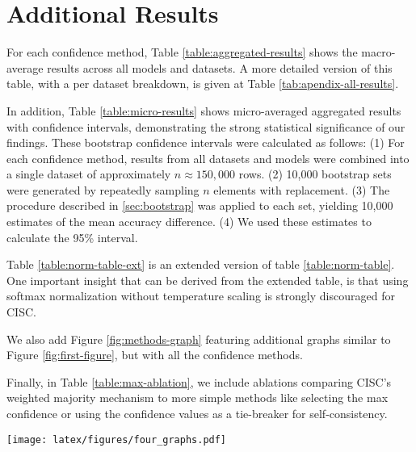 \section{Additional Results}
\label{sec:appendix-more-results}

For each confidence method, Table \ref{table:aggregated-results} shows the macro-average results across all models and datasets. A more detailed version of this table, with a per dataset breakdown, is given at Table \ref{tab:apendix-all-results}.

In addition, Table \ref{table:micro-results} shows micro-averaged aggregated results with confidence intervals, demonstrating the strong statistical significance of our findings. These bootstrap confidence intervals were calculated as follows: (1) For each confidence method, results from all datasets and models were combined into a single dataset of approximately $n \approx 150,000$ rows. (2) 10,000 bootstrap sets were generated by repeatedly sampling $n$ elements with replacement. (3) The procedure described in \ref{sec:bootstrap} was applied to each set, yielding 10,000 estimates of the mean accuracy difference. (4) We used these estimates to calculate the 95\% interval.

Table \ref{table:norm-table-ext} is an extended version of table \ref{table:norm-table}. One important insight that can be derived from the extended table, is that using softmax normalization without temperature scaling is strongly discouraged for CISC.

We also add Figure \ref{fig:methods-graph} featuring additional graphs similar to Figure \ref{fig:first-figure}, but with all the confidence methods. 

Finally, in Table \ref{table:max-ablation}, we include ablations comparing CISC's weighted majority mechanism to more simple methods like selecting the max confidence \cite{wang2024soft} or using the confidence values as a tie-breaker for self-consistency.

\begin{figure*}[h]
    \centering
    \texttt{[image: latex/figures/four\_graphs.pdf]}
    \caption{Comparison between different confidence extraction methods using Gemma2-9B model and four datasets (\S\ref{sec:datasets}). CISC with P(True) outperforms Self-Consistency and is the best of all the CISC variants.
    }
    \label{fig:methods-graph}
\end{figure*}



